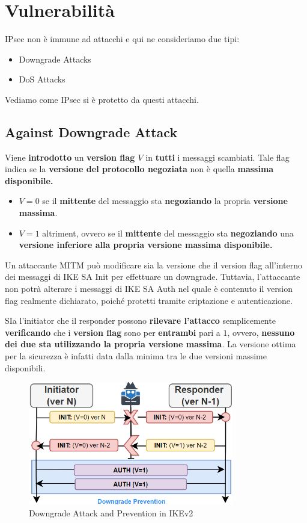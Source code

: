 \section{Vulnerabilità}
IPsec non è immune ad attacchi e qui ne consideriamo due tipi:
\begin{itemize}
    \item Downgrade Attacks
    \item DoS Attacks
\end{itemize}
Vediamo come IPsec si è protetto da questi attacchi.
\subsection{Against Downgrade Attack}
Viene \textbf{introdotto} un \textbf{version flag $V$} in \textbf{tutti} i messaggi scambiati. Tale flag indica se la \textbf{versione del protocollo negoziata} non è quella \textbf{massima disponibile.}
\begin{definition}\label{def:versionflag}
\begin{itemize}
    \item \textbf{$V=0$} se il \textbf{mittente} del messaggio sta \textbf{negoziando} la propria \textbf{versione massima}.
    \item \textbf{$V=1$} altriment, ovvero se il \textbf{mittente} del messaggio sta \textbf{negoziando} una \textbf{versione inferiore alla propria versione massima disponibile.}
\end{itemize}
\end{definition}
Un attaccante MITM può modificare sia la versione che il version flag all'interno dei messaggi di IKE SA Init per effettuare un downgrade. Tuttavia, l'attaccante non potrà alterare i messaggi di IKE SA Auth nel quale è contenuto il version flag realmente dichiarato, poiché protetti tramite criptazione e autenticazione.\\
\begin{remark}
SIa l'initiator che il responder possono \textbf{rilevare l'attacco} semplicemente \textbf{verificando} che i \textbf{version flag} sono per \textbf{entrambi} pari a $1$, ovvero, \textbf{nessuno dei due sta utilizzando la propria versione massima}. La versione ottima per la sicurezza è infatti data dalla minima tra le due versioni massime disponibili.
\end{remark}
\begin{figure}[ht]
    \centering
    \includegraphics[width=0.8\textwidth]{image/ikedown.png}
    \caption{Downgrade Attack and Prevention in IKEv2}
    \label{fig:ikedown}
\end{figure}
